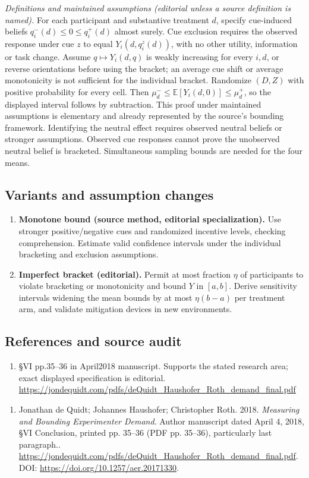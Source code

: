 \documentclass[11pt,a4paper]{article}
\begin{document}
\emph{Definitions and maintained assumptions (editorial unless a source definition is named).} For each participant and substantive treatment \(d\), specify cue-induced beliefs \(q_i^-(d)\le0\le q_i^+(d)\) almost surely. Cue exclusion requires the observed response under cue \(z\) to equal \(Y_i(d,q_i^z(d))\), with no other utility, information or task change. Assume \(q\mapsto Y_i(d,q)\) is weakly increasing for every \(i,d\), or reverse orientations before using the bracket; an average cue shift or average monotonicity is not sufficient for the individual bracket. Randomize \((D,Z)\) with positive probability for every cell. Then \(\mu_d^-\le\mathbb E[Y_i(d,0)]\le\mu_d^+\), so the displayed interval follows by subtraction. This proof under maintained assumptions is elementary and already represented by the source’s bounding framework. Identifying the neutral effect requires observed neutral beliefs or stronger assumptions. Observed cue responses cannot prove the unobserved neutral belief is bracketed. Simultaneous sampling bounds are needed for the four means.
\subsection*{Variants and assumption changes}
\begin{enumerate}
\item \textbf{Monotone bound (source method, editorial specialization).} Use stronger positive/negative cues and randomized incentive levels, checking comprehension. Estimate valid confidence intervals under the individual bracketing and exclusion assumptions.
\item \textbf{Imperfect bracket (editorial).} Permit at most fraction \(\eta\) of participants to violate bracketing or monotonicity and bound \(Y\) in \([a,b]\). Derive sensitivity intervals widening the mean bounds by at most \(\eta(b-a)\) per treatment arm, and validate mitigation devices in new environments.
\end{enumerate}
\subsection*{References and source audit}
\begin{enumerate}
\item §VI pp.35–36 in April2018 manuscript. Supports the stated research area; exact displayed specification is editorial. \url{https://jondequidt.com/pdfs/deQuidt_Haushofer_Roth_demand_final.pdf}
\end{enumerate}
\begin{enumerate}\raggedright
\item\hypertarget{definitions:source:30007589:1}{} Jonathan de Quidt; Johannes Haushofer; Christopher Roth. 2018. \emph{Measuring and Bounding Experimenter Demand}. Author manuscript dated April 4, 2018, §VI Conclusion, printed pp. 35–36 (PDF pp. 35–36), particularly last paragraph..
\url{https://jondequidt.com/pdfs/deQuidt_Haushofer_Roth_demand_final.pdf}.
DOI: \url{https://doi.org/10.1257/aer.20171330}.
\end{enumerate}
\end{document}

